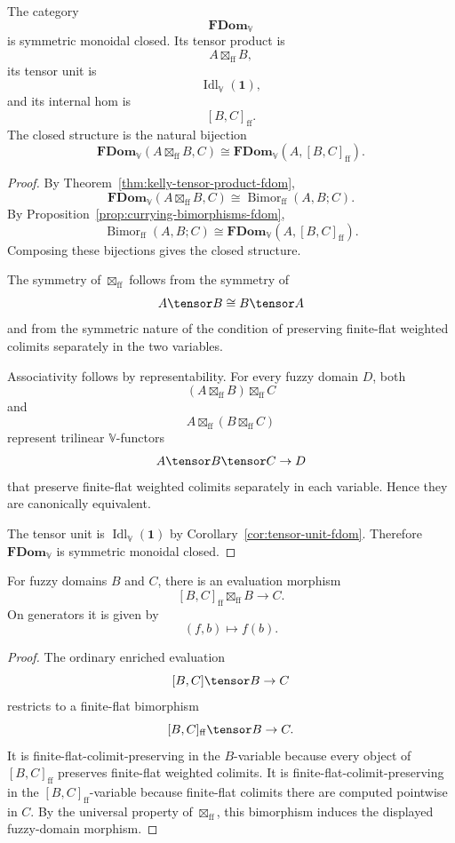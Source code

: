 \begin{theorem}
\label{thm:fdom-smc}
The category
\[
    \mathbf{FDom}_{\mathbb V}
\]
is symmetric monoidal closed.  Its tensor product is
\[
    A\boxtimes_{\mathrm{ff}}B,
\]
its tensor unit is
\[
    \operatorname{Idl}_{\mathbb V}(\mathbf 1),
\]
and its internal hom is
\[
    [B,C]_{\mathrm{ff}}.
\]
The closed structure is the natural bijection
\[
    \mathbf{FDom}_{\mathbb V}(A\boxtimes_{\mathrm{ff}}B,C)
    \cong
    \mathbf{FDom}_{\mathbb V}(A,[B,C]_{\mathrm{ff}}).
\]
\end{theorem}

\begin{proof}
By Theorem~\ref{thm:kelly-tensor-product-fdom},
\[
    \mathbf{FDom}_{\mathbb V}(A\boxtimes_{\mathrm{ff}}B,C)
    \cong
    \operatorname{Bimor}_{\mathrm{ff}}(A,B;C).
\]
By Proposition~\ref{prop:currying-bimorphisms-fdom},
\[
    \operatorname{Bimor}_{\mathrm{ff}}(A,B;C)
    \cong
    \mathbf{FDom}_{\mathbb V}(A,[B,C]_{\mathrm{ff}}).
\]
Composing these bijections gives the closed structure.

The symmetry of \(\boxtimes_{\mathrm{ff}}\) follows from the symmetry of
\[
    A\tensor B\cong B\tensor A
\]
and from the symmetric nature of the condition of preserving finite-flat
weighted colimits separately in the two variables.

Associativity follows by representability.  For every fuzzy domain \(D\), both
\[
    (A\boxtimes_{\mathrm{ff}}B)\boxtimes_{\mathrm{ff}}C
\]
and
\[
    A\boxtimes_{\mathrm{ff}}(B\boxtimes_{\mathrm{ff}}C)
\]
represent trilinear \(\mathbb V\)-functors
\[
    A\tensor B\tensor C\to D
\]
that preserve finite-flat weighted colimits separately in each variable.  Hence
they are canonically equivalent.

The tensor unit is \(\operatorname{Idl}_{\mathbb V}(\mathbf 1)\) by
Corollary~\ref{cor:tensor-unit-fdom}.  Therefore \(\mathbf{FDom}_{\mathbb V}\) is
symmetric monoidal closed.
\end{proof}

\begin{corollary}[Evaluation]
\label{cor:evaluation-fdom}
For fuzzy domains \(B\) and \(C\), there is an evaluation morphism
\[
    [B,C]_{\mathrm{ff}}\boxtimes_{\mathrm{ff}}B
    \longrightarrow
    C.
\]
On generators it is given by
\[
    (f,b)\longmapsto f(b).
\]
\end{corollary}

\begin{proof}
The ordinary enriched evaluation
\[
    [B,C]\tensor B\to C
\]
restricts to a finite-flat bimorphism
\[
    [B,C]_{\mathrm{ff}}\tensor B\to C.
\]
It is finite-flat-colimit-preserving in the \(B\)-variable because every object
of \([B,C]_{\mathrm{ff}}\) preserves finite-flat weighted colimits.  It is
finite-flat-colimit-preserving in the \([B,C]_{\mathrm{ff}}\)-variable because
finite-flat colimits there are computed pointwise in \(C\).  By the universal
property of \(\boxtimes_{\mathrm{ff}}\), this bimorphism induces the displayed
fuzzy-domain morphism.
\end{proof}

